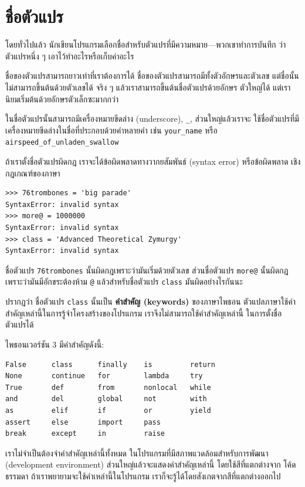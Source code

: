 \section{ชื่อตัวแปร} %

โดยทั่วไปแล้ว นักเขียนโปรแกรมเลือกชื่อสำหรับตัวแปรที่มีความหมาย---พวกเขาทำการบันทึก
ว่าตัวแปรหนึ่ง ๆ เอาไว้ทำอะไรหรือเก็บค่าอะไร

ชื่อของตัวแปรสามารถยาวเท่าที่เราต้องการได้ ชื่อของตัวแปรสามารถมีทั้งตัวอักษรและตัวเลข
แต่ชื่อนั้นไม่สามารถขึ้นต้นด้วยตัวเลขได้  จริง ๆ แล้วเราสามารถขึ้นต้นชื่อตัวแปรด้วยอักษร
ตัวใหญ่ได้ แต่เรานิยมเริ่มต้นด้วยอักษรตัวเล็กซะมากกว่า

ในชื่อตัวแปรนั้นสามารถมีเครื่องหมายขีดล่าง (underscore), \verb|_|, ส่วนใหญ่แล้วเราจะ
ใช้ชื่อตัวแปรที่มีเครื่องหมายขีดล่างในชื่อที่ประกอบด้วยคำหลายคำ เช่น \verb|your_name| หรือ
 \verb|airspeed_of_unladen_swallow|

ถ้าเราตั้งชื่อตัวแปรผิดกฎ เราจะได้ข้อผิดพลาดทางวากยสัมพันธ์ (syntax error) หรือข้อผิดพลาด
เชิงกฎเกณฑ์ของภาษา

\begin{verbatim}
>>> 76trombones = 'big parade'
SyntaxError: invalid syntax
>>> more@ = 1000000
SyntaxError: invalid syntax
>>> class = 'Advanced Theoretical Zymurgy'
SyntaxError: invalid syntax
\end{verbatim}
%
ชื่อตัวแปร {\tt 76trombones} นั้นผิดกฎเพราะว่ามันเริ่มด้วยตัวเลข
ส่วนชื่อตัวแปร {\tt more@} นั้นผิดกฎเพราะว่ามันมีอักขระต้องห้าม {\tt @}
แล้วสำหรับชื่อตัวแปร {\tt class} มันผิดอย่างไรกันนะ

ปรากฏว่า ชื่อตัวแปร {\tt class} นั้นเป็น {\bf คำสำคัญ (keywords)} ของภาษาไพธอน
ตัวแปลภาษาใช้คำสำคัญเหล่านี้ในการรู้จำโครงสร้างของโปรแกรม เราจึงไม่สามารถใช้คำสำคัญเหล่านี้
ในการตั้งชื่อตัวแปรได้

ไพธอนเวอร์ชัน 3 มีคำสำคัญดังนี้:

\begin{verbatim}
False      class      finally    is         return
None       continue   for        lambda     try
True       def        from       nonlocal   while
and        del        global     not        with
as         elif       if         or         yield
assert     else       import     pass
break      except     in         raise
\end{verbatim}
%
เราไม่จำเป็นต้องจำคำสำคัญเหล่านี้ทั้งหมด ในโปรแกรมที่มีสภาพแวดล้อมสำหรับการพัฒนา 
(development environment) ส่วนใหญ่แล้วจะแสดงคำสำคัญเหล่านี้ โดยใช้สีที่แตกต่างจาก
โค้ดธรรมดา ถ้าเราพยายามจะใช้คำเหล่านี้ในโปรแกรม เราก็จะรู้ได้โดยสังเกตจากสีที่แตกต่างออกไป


